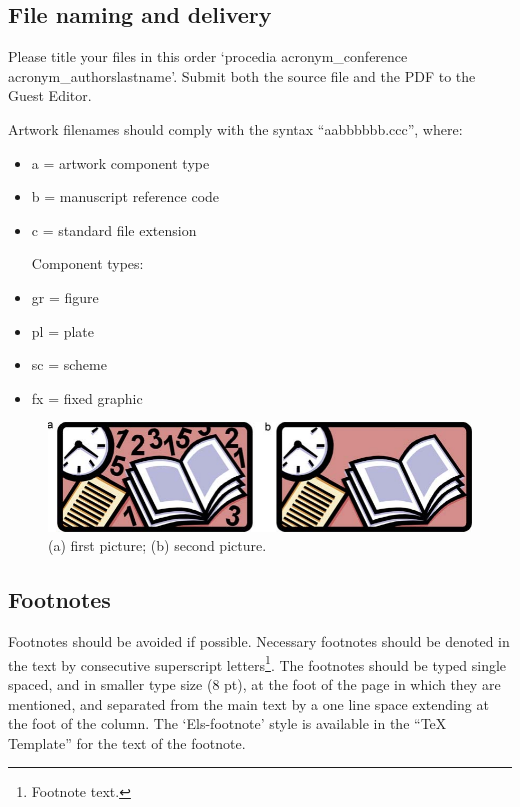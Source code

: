 \documentclass[5p,times,procedia]{elsarticle}
\begin{document}
\subsection{File naming and delivery}
Please title your files in this order `procedia acronym\_conference acronym\_authorslastname'.  Submit both the source file and the PDF to the Guest Editor.

Artwork filenames should comply with the syntax ``aabbbbbb.ccc'', where:
\begin{itemize}
\item a = artwork component type
\item b = manuscript reference code
\item c = standard file extension

Component types:
\item gr = figure
\item pl = plate
\item sc = scheme
\item fx = fixed graphic
\end{itemize}

\begin{figure}[t]\vspace*{4pt}
\centerline{\includegraphics{graphics/gr1}}
\caption{(a) first picture; (b) second picture.}
\end{figure}


\subsection{Footnotes}
Footnotes should be avoided if possible. Necessary footnotes should be denoted in the text by consecutive superscript letters\footnote{Footnote text.}. The footnotes should be typed single spaced, and in smaller type size (8 pt), at the foot of the page in which they are mentioned, and separated from the main text by a one line space extending at the foot of the column. The `Els-footnote' style is available in the ``TeX Template'' for the text of the footnote.
\end{document}

